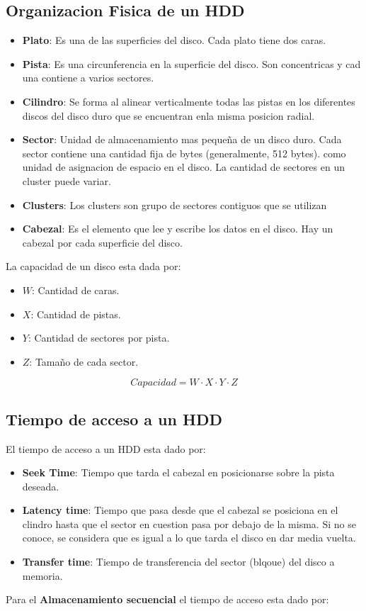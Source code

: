 \documentclass[12pt]{article}
\begin{document}
\subsection{Organizacion Fisica de un HDD}
\begin{itemize}
    \item \textbf{Plato}: Es una de las superficies del disco. Cada plato tiene dos caras.
    \item \textbf{Pista}: Es una circunferencia en la superficie del disco. Son concentricas y cad una contiene a varios sectores.
    \item \textbf{Cilindro}: Se forma al alinear verticalmente todas las pistas en los diferentes discos del disco duro que se encuentran enla misma posicion radial.
    \item \textbf{Sector}: Unidad de almacenamiento mas pequeña de un disco duro. Cada sector contiene una cantidad fija de bytes (generalmente, 512 bytes).
        como unidad de asignacion de espacio en el disco. La cantidad de sectores en un cluster puede variar.
    \item \textbf{Clusters}: Los clusters son grupo de sectores contiguos que se utilizan 
    \item \textbf{Cabezal}: Es el elemento que lee y escribe los datos en el disco. Hay un cabezal por cada superficie del disco.
\end{itemize}
La capacidad de un disco esta dada por:
\begin{itemize}
    \item $W$: Cantidad de caras.
    \item $X$: Cantidad de pistas.
    \item $Y$: Cantidad de sectores por pista.
    \item $Z$: Tamaño de cada sector.
\end{itemize}

\begin{equation}
Capacidad = W \cdot X \cdot Y \cdot Z
    \label{eq:1}
\end{equation}


\subsection{Tiempo de acceso a un HDD}
El tiempo de acceso a un HDD esta dado por:
\begin{itemize}
    \item \textbf{Seek Time}: Tiempo que tarda el cabezal en posicionarse sobre la pista deseada.
    \item \textbf{Latency time}: Tiempo que pasa desde que el cabezal se posiciona en el clindro hasta que el sector en cuestion pasa por debajo de la misma. Si no se conoce, se considera que es igual a lo que tarda el disco en dar media vuelta.
    \item \textbf{Transfer time}: Tiempo de transferencia del sector (blqoue) del disco a memoria.
\end{itemize}
Para el \textbf{Almacenamiento secuencial} el tiempo de acceso esta dado por:
\end{document}
